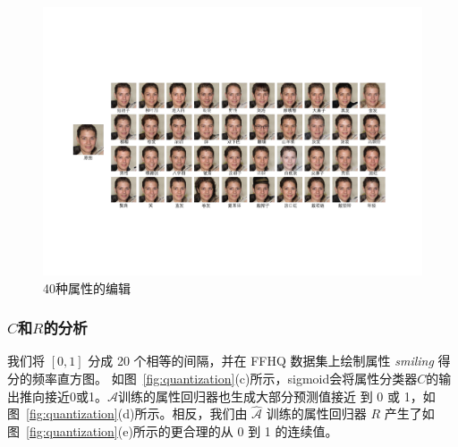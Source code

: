 \begin{figure}[!t]
    \begin{center}
       \includegraphics[width=0.9\linewidth]{figures/ACGAN/40Attributes.pdf}
    \end{center}
    \caption{40种属性的编辑}
    \label{fig:40Attributes}
\end{figure}

\subsubsection{$C$和$R$的分析}
我们将 $[0,1]$ 分成 20 个相等的间隔，并在 FFHQ 数据集上绘制属性 \textit{smiling} 得分的频率直方图。 如图~\ref{fig:quantization}(c)所示，sigmoid会将属性分类器$C$的输出推向接近0或1。$\mathcal{A}$训练的属性回归器也生成大部分预测值接近 到 0 或 1，如图~\ref{fig:quantization}(d)所示。相反，我们由 $\hat{\mathcal{A}}$ 训练的属性回归器 $R$ 产生了如图~\ref{fig:quantization}(e)所示的更合理的从 0 到 1 的连续值。 

